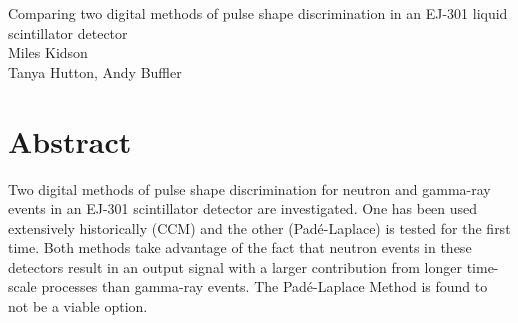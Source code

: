 \documentclass[11pt]{article}
\numberwithin{equation}{section}
\numberwithin{figure}{section}
\numberwithin{table}{section}
\begin{document}
\begin{center}
    {\huge Comparing two digital methods of pulse shape discrimination in an EJ-301 liquid scintillator detector}\\
    \vspace{0.2in}
    {\Large Miles Kidson}\\
    \vspace{0.1in}
    {\large Tanya Hutton, Andy Buffler}\\

    \section*{Abstract}\label{sec:Abstract} %
    Two digital methods of pulse shape discrimination for neutron and gamma-ray events in an EJ-301 scintillator detector are investigated. One has been used extensively historically (CCM) and the other (Pad\'e-Laplace) is tested for the first time. Both methods take advantage of the fact that neutron events in these detectors result in an output signal with a larger contribution from longer time-scale processes than gamma-ray events. The Pad\'e-Laplace Method is found to not be a viable option. 
    
\end{center}
\end{document}
